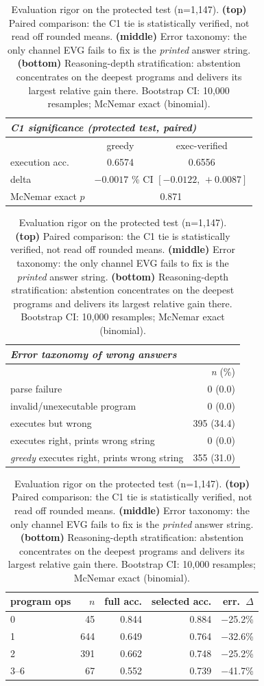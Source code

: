 \documentclass[10pt]{article}
\begin{document}
\begin{table}[t]
\centering
\caption{\label{tab:rigor} Evaluation rigor on the protected test (n=1,147). \textbf{(top)}
Paired comparison: the C1 tie is statistically verified, not read off rounded means.
\textbf{(middle)} Error taxonomy: the only channel EVG fails to fix is the \emph{printed}
answer string. \textbf{(bottom)} Reasoning-depth stratification: abstention concentrates on
the deepest programs and delivers its largest relative gain there. Bootstrap CI: 10{,}000
resamples; McNemar exact (binomial).}
\small
\begin{tabular}{lcc}
\toprule
\multicolumn{3}{l}{\emph{C1 significance (protected test, paired)}}\\
\toprule
 & greedy & exec-verified\\
\midrule
execution acc. & 0.6574 & 0.6556\\
delta & \multicolumn{2}{c}{$-0.0017$ \quad 95\% CI $[-0.0122,\,+0.0087]$}\\
McNemar exact $p$ & \multicolumn{2}{c}{0.871}\\
\bottomrule
\end{tabular}
\vspace{0.6em}
\begin{tabular}{lr}
\toprule
\multicolumn{2}{l}{\emph{Error taxonomy of wrong answers}}\\
\midrule
& \emph{n} (\%) \\
parse failure & 0 (0.0)\\
invalid/unexecutable program & 0 (0.0)\\
executes but wrong & 395 (34.4)\\
executes right, prints wrong string & 0 (0.0) \\
\emph{greedy} executes right, prints wrong string & 355 (31.0)\\
\bottomrule
\end{tabular}
\vspace{0.6em}
\begin{tabular}{lrrrr}
\toprule
program ops & $n$ & full acc. & selected acc. & err.\ $\Delta$\\
\midrule
0 & 45 & 0.844 & 0.884 & $-$25.2\%\\
1 & 644 & 0.649 & 0.764 & $-$32.6\%\\
2 & 391 & 0.662 & 0.748 & $-$25.2\%\\
3--6 & 67 & 0.552 & 0.739 & $-$41.7\%\\
\bottomrule
\end{tabular}
\end{table}
\end{document}
